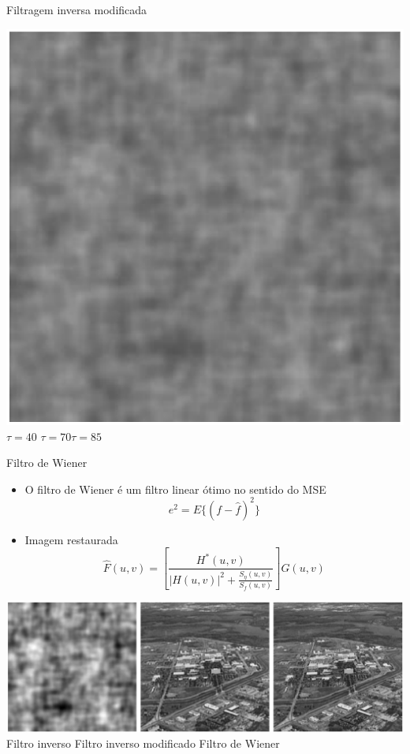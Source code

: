 \begin{slide}{Filtragem inversa modificada}
\begin{center}
			\includegraphics[height = 0.35\textheight]{figs/5-27d}\\
			{\small	$\tau = 40$ \hspace{3.5cm}$\tau = 70$\hspace{3.5cm}$\tau = 85$}
		\end{center}
	
\end{slide}

\begin{slide}{Filtro de Wiener}
	\small
	\begin{itemize}
		\item O filtro de Wiener é um filtro linear ótimo no sentido do MSE
			\begin{equation*}
				e^2 = E\{(f - \hat f)^2\}
			\end{equation*}
		\item Imagem restaurada
			\begin{equation*}
				\hat F(u,v) = \left [ \frac{H^\ast(u,v)}{|H(u,v)|^2 + \frac{S_\eta(u,v)}{S_f(u,v)}}\right ]G(u,v)
			\end{equation*}
	\end{itemize}
		\begin{center}
			\includegraphics[height = 0.35\textheight]{figs/5-28}\\
			{\footnotesize	Filtro inverso \hspace{2.0cm}Filtro inverso modificado \hspace{2.0cm} Filtro de Wiener}
		\end{center}
\end{slide}

